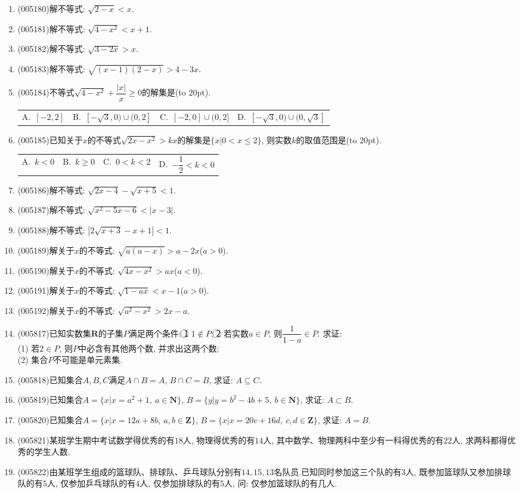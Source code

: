 \documentclass[10pt,a4paper]{article}
\newcommand{\bracket}[1]{(\hbox to #1pt{})}
\newcommand{\fourch}[4]{\par\begin{tabular}{p{.23\textwidth}p{.23\textwidth}p{.23\textwidth}p{.23\textwidth}}
A.~#1 &B.~#2& C.~#3& D.~#4
\end{tabular}}
\begin{document}
\begin{enumerate}[1.]
\item {\tiny (005180)}解不等式: $\sqrt{2-x}<x$.
\item {\tiny (005181)}解不等式: $\sqrt{4-x^2}<x+1$.
\item {\tiny (005182)}解不等式: $\sqrt{3-2x}>x$.
\item {\tiny (005183)}解不等式: $\sqrt{(x-1)(2-x)}>4-3x$.
\item {\tiny (005184)}不等式$\sqrt{4-x^2}+\dfrac{|x|}x\ge 0$的解集是\bracket{20}.
\fourch{$[-2,2]$}{$[-\sqrt 3,0)\cup (0,2]$}{$[-2,0]\cup (0,2]$}{$[-\sqrt 3,0)\cup (0,\sqrt 3]$}
\item {\tiny (005185)}已知关于$x$的不等式$\sqrt{2x-x^2}>kx$的解集是$\{x|0<x\le 2\}$, 则实数$k$的取值范围是\bracket{20}.
\fourch{$k<0$}{$k\ge 0$}{$0<k<2$}{$-\dfrac 12<k<0$}
\item {\tiny (005186)}解不等式: $\sqrt{2x-4}-\sqrt{x+5}<1$.
\item {\tiny (005187)}解不等式: $\sqrt{x^2-5x-6}<|x-3|$.
\item {\tiny (005188)}解不等式: $|2\sqrt{x+3}-x+1|<1$.
\item {\tiny (005189)}解关于$x$的不等式: $\sqrt{a(a-x)}>a-2x$($a>0$).
\item {\tiny (005190)}解关于$x$的不等式: $\sqrt{4x-x^2}>ax$($a<0$).
\item {\tiny (005191)}解关于$x$的不等式: $\sqrt{1-ax}<x-1$($a>0$).
\item {\tiny (005192)}解关于$x$的不等式: $\sqrt{a^2-x^2}>2x-a$.
\item {\tiny (005817)}已知实数集$\mathbf{R}$的子集$P$满足两个条件: \textcircled{1} $1\notin P$; \textcircled{2} 若实数$a\in P$, 则$\dfrac 1{1-a}\in P$. 求证:\\
(1) 若$2\in P$, 则$P$中必含有其他两个数, 并求出这两个数;\\
(2) 集合$P$不可能是单元素集.
\item {\tiny (005818)}已知集合$A,B,C$满足$A\cap B=A$, $B\cap C=B$, 求证: $A\subseteq C$.
\item {\tiny (005819)}已知集合$A=\{x|x=a^2+1,\ a\in \mathbf{N}\}$, $B=\{y|y=b^2-4b+5,\ b\in \mathbf{N}\}$, 求证: $A\subset B$.
\item {\tiny (005820)}已知集合$A=\{x|x=12a+8b,\ a,b\in \mathbf{Z}\}$, $B=\{x|x=20c+16d,\ c,d\in \mathbf{Z}\}$, 求证: $A=B$.
\item {\tiny (005821)}某班学生期中考试数学得优秀的有$18$人, 物理得优秀的有$14$人, 其中数学、物理两科中至少有一科得优秀的有$22$人, 求两科都得优秀的学生人数.
\item {\tiny (005822)}由某班学生组成的篮球队、排球队、乒乓球队分别有$14, 15, 13$名队员.已知同时参加这三个队的有$3$人, 既参加篮球队又参加排球队的有$5$人, 仅参加乒乓球队的有$4$人, 仅参加排球队的有$5$人, 问: 仅参加篮球队的有几人.

\end{enumerate}
\end{document}
